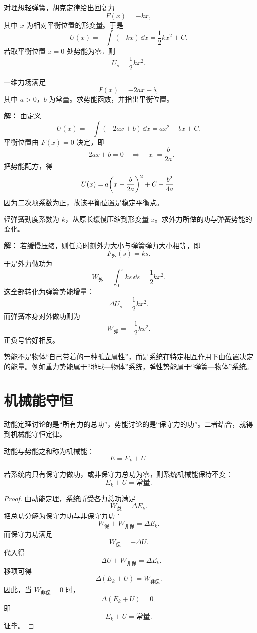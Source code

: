 对理想轻弹簧，胡克定律给出回复力
\[
F(x)=-kx,
\]
其中 $x$ 为相对平衡位置的形变量。于是
\[
U(x)=-\int (-kx)\,\dd x=\frac{1}{2}kx^2+C.
\]
若取平衡位置 $x=0$ 处势能为零，则
\[
U_s=\frac{1}{2}kx^2.
\]

\begin{example}[由力求势能]
一维力场满足
\[
F(x)=-2ax+b,
\]
其中 $a>0$，$b$ 为常量。求势能函数，并指出平衡位置。

\textbf{解：}
由定义
\[
U(x)=-\int (-2ax+b)\,\dd x = ax^2-bx+C.
\]
平衡位置由 $F(x)=0$ 决定，即
\[
-2ax+b=0
\quad\Longrightarrow\quad
x_0=\frac{b}{2a}.
\]
把势能配方，得
\[
U(x)=a\qty(x-\frac{b}{2a})^2 + C-\frac{b^2}{4a}.
\]
因为二次项系数为正，故该平衡位置是稳定平衡点。
\end{example}

\begin{example}[弹簧势能与做功]
轻弹簧劲度系数为 $k$，从原长缓慢压缩到形变量 $x$。求外力所做的功与弹簧势能的变化。

\textbf{解：}
若缓慢压缩，则任意时刻外力大小与弹簧弹力大小相等，即
\[
F_{\text{外}}(s)=ks.
\]
于是外力做功为
\[
W_{\text{外}}=\int_0^x ks\,\dd s=\frac{1}{2}kx^2.
\]
这全部转化为弹簧势能增量：
\[
\Delta U_s = \frac{1}{2}kx^2.
\]
而弹簧本身对外做功则为
\[
W_{\text{弹}}=-\frac{1}{2}kx^2.
\]
正负号恰好相反。
\end{example}

\begin{remark}
势能不是物体“自己带着的一种孤立属性”，而是系统在特定相互作用下由位置决定的能量。例如重力势能属于“地球—物体”系统，弹性势能属于“弹簧—物体”系统。
\end{remark}

\section{机械能守恒}\label{sec:mechanical-energy}

动能定理讨论的是“所有力的总功”，势能讨论的是“保守力的功”。二者结合，就得到机械能守恒定律。

\begin{definition}[机械能]
动能与势能之和称为机械能：
\[
E=E_k+U.
\]
\end{definition}

\begin{law}[机械能守恒定律]
若系统内只有保守力做功，或非保守力总功为零，则系统机械能保持不变：
\[
E_k+U=\text{常量}.
\]
\end{law}

\begin{proof}
由动能定理，系统所受各力总功满足
\[
W_{\text{总}}=\Delta E_k.
\]
把总功分解为保守力功与非保守力功：
\[
W_{\text{保}}+W_{\text{非保}}=\Delta E_k.
\]
而保守力功满足
\[
W_{\text{保}}=-\Delta U.
\]
代入得
\[
-\Delta U + W_{\text{非保}} = \Delta E_k.
\]
移项可得
\[
\Delta(E_k+U)=W_{\text{非保}}.
\]
因此，当 $W_{\text{非保}}=0$ 时，
\[
\Delta(E_k+U)=0,
\]
即
\[
E_k+U=\text{常量}.
\]
证毕。
\end{proof}

